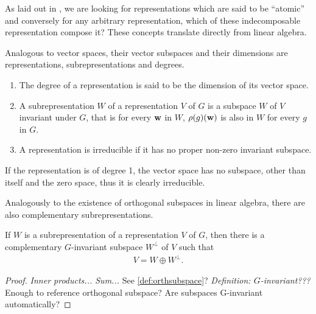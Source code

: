 		As laid out in \cite{FultonHarris}, we are looking for representations which are said to be ``atomic'' and conversely for any arbitrary representation, which of these indecomposable representation compose it? These concepts translate directly from linear algebra. 
		
		\begin{definition}
			Analogous to vector spaces, their vector subspaces and their dimensions are representations, subrepresentations and degrees. 		
			\begin{enumerate}
				\item The degree of a representation is said to be the dimension of its vector space.
				\item A subrepresentation $W$ of a representation $V$ of $G$ is a subspace $W$ of $V$ invariant under $G$, that is for every $\mathbf{w}$ in $W$, $\rho(g)(\mathbf{w})$ is also in $W$ for every $g$ in $G$.
				\item A representation is irreducible if it has no proper non-zero invariant subspace.
			\end{enumerate}
		\end{definition}

		\begin{corollary}
			If the representation is of degree 1, the vector space has no subspace, other than itself and the zero space, thus it is clearly irreducible.
		\end{corollary}
		
		
		
		Analogously to the existence of orthogonal subspaces in linear algebra, there are also complementary subrepresentations.
		
		\begin{proposition}\cite[Prop.1.5]{FultonHarris}\label{prop:compsubrepr}
			If $W$ is a subrepresentation of a representation $V$ of $G$, then there is a complementary $G$-invariant subspace $W^\perp$ of $V$ such that 
			\begin{align}
				V = W \oplus W^\perp.
			\end{align}
		\end{proposition}
		\begin{proof}
			\textit{Inner products... Sum...} See \ref{def:orthsubspace}? \textit{Definition: $G$-invariant???} Enough to reference orthogonal subspace? Are subspaces G-invariant automatically?
		\end{proof}
		
